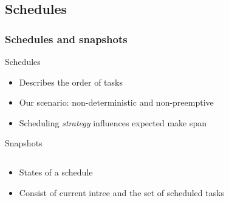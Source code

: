 \documentclass{beamer}
\begin{document}
\subsection{Schedules}
\label{sec:schedules}

\begin{frame}
  \frametitle{Schedules and snapshots}
  \begin{block}{Schedules}
    \begin{itemize}
    \item Describes the order of tasks
    \item Our scenario: non-deterministic and non-preemptive
    \item Scheduling \emph{strategy} influences expected make span
    \end{itemize}
  \end{block}
  \begin{block}{Snapshots}
    \begin{columns}
      \begin{column}{.7\textwidth}
        \begin{itemize}
        \item States of a schedule
        \item Consist of current intree and the set of scheduled tasks
        \end{itemize}
      \end{column}
      \begin{column}{.3\textwidth}
        \centering
        
      \end{column}
    \end{columns}
  \end{block}
\end{frame}

\end{document}
